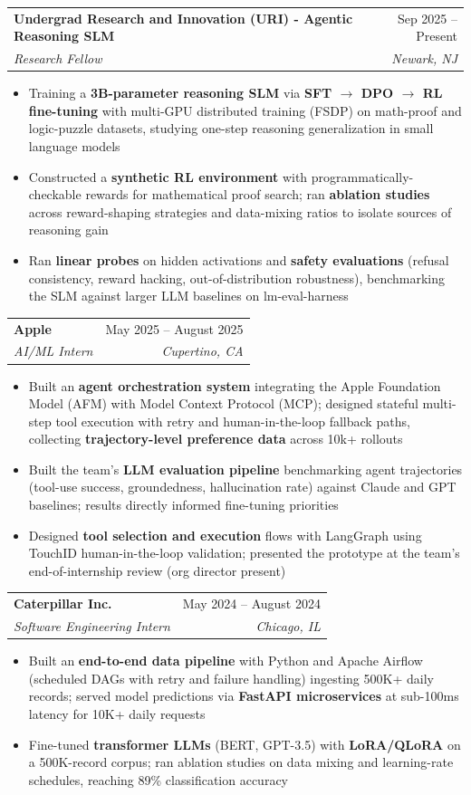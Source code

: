 \documentclass[letterpaper,10pt]{article}
\makeatletter
\newcommand{\resumeItem}[1]{
  \item\small{
    {#1 \vspace{-3pt}}
  }
}
\newcommand{\resumeSubheading}[4]{
  \vspace{-3pt}\item
    \begin{tabular*}{0.97\textwidth}[t]{l@{\extracolsep{\fill}}r}
      \textbf{#1} & #2 \\
      \textit{\small#3} & \textit{\small #4} \\
    \end{tabular*}\vspace{-9pt}
}
\newcommand{\resumeItemListStart}{\begin{itemize}}
\newcommand{\resumeItemListEnd}{\end{itemize}\vspace{-7pt}}
\makeatother
\begin{document}
\vspace{5pt}
\resumeSubheading
{Undergrad Research and Innovation (URI) - Agentic Reasoning SLM}{Sep 2025 -- Present}
{Research Fellow}{Newark, NJ}
\vspace{5pt}
\resumeItemListStart
\resumeItem{Training a \textbf{3B-parameter reasoning SLM} via \textbf{SFT $\rightarrow$ DPO $\rightarrow$ RL fine-tuning} with multi-GPU distributed training (FSDP) on math-proof and logic-puzzle datasets, studying one-step reasoning generalization in small language models}
\resumeItem{Constructed a \textbf{synthetic RL environment} with programmatically-checkable rewards for mathematical proof search; ran \textbf{ablation studies} across reward-shaping strategies and data-mixing ratios to isolate sources of reasoning gain}
\resumeItem{Ran \textbf{linear probes} on hidden activations and \textbf{safety evaluations} (refusal consistency, reward hacking, out-of-distribution robustness), benchmarking the SLM against larger LLM baselines on lm-eval-harness}
\resumeItemListEnd
\vspace{5pt}
\resumeSubheading
{Apple}{May 2025 -- August 2025}
{AI/ML Intern}{Cupertino, CA}
\vspace{5pt}
\resumeItemListStart
\resumeItem{Built an \textbf{agent orchestration system} integrating the Apple Foundation Model (AFM) with Model Context Protocol (MCP); designed stateful multi-step tool execution with retry and human-in-the-loop fallback paths, collecting \textbf{trajectory-level preference data} across 10k+ rollouts}
\resumeItem{Built the team's \textbf{LLM evaluation pipeline} benchmarking agent trajectories (tool-use success, groundedness, hallucination rate) against Claude and GPT baselines; results directly informed fine-tuning priorities}
\resumeItem{Designed \textbf{tool selection and execution} flows with LangGraph using TouchID human-in-the-loop validation; presented the prototype at the team's end-of-internship review (org director present)}
\resumeItemListEnd


\vspace{5pt}
\resumeSubheading
{Caterpillar Inc.}{May 2024 -- August 2024}
{Software Engineering Intern}{Chicago, IL}
\vspace{5pt}
\resumeItemListStart
\resumeItem{Built an \textbf{end-to-end data pipeline} with Python and Apache Airflow (scheduled DAGs with retry and failure handling) ingesting 500K+ daily records; served model predictions via \textbf{FastAPI microservices} at sub-100ms latency for 10K+ daily requests}
\resumeItem{Fine-tuned \textbf{transformer LLMs} (BERT, GPT-3.5) with \textbf{LoRA/QLoRA} on a 500K-record corpus; ran ablation studies on data mixing and learning-rate schedules, reaching 89\% classification accuracy}
\resumeItemListEnd
\end{document}
